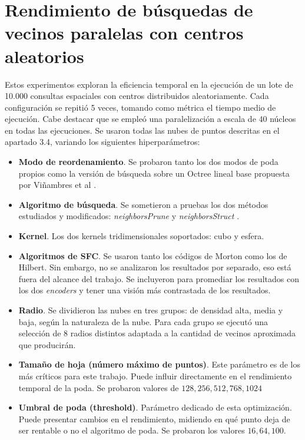 \section{Rendimiento de búsquedas de vecinos paralelas con centros aleatorios}
Estos experimentos exploran la eficiencia temporal en la ejecución de un lote de 10.000 consultas espaciales con centros distribuidos aleatoriamente. Cada configuración se repitió 5 veces, tomando como métrica el tiempo medio de ejecución. Cabe destacar que se empleó una paralelización a escala de 40 núcleos en todas las ejecuciones. Se usaron todas las nubes de puntos descritas en el apartado 3.4, variando los siguientes hiperparámetros:
\begin{itemize}
    \item \textbf{Modo de reordenamiento}. Se probaron tanto los dos modos de poda propios como la versión de búsqueda sobre un Octree lineal base propuesta por Viñambres et al \cite{Vinambres}.
    \item \textbf{Algoritmo de búsqueda}. Se sometieron a pruebas los dos métodos estudiados y modificados: \textit{neighborsPrune} y \textit{neighborsStruct} .
    \item  \textbf{Kernel}. Los dos kernels tridimensionales soportados: cubo y esfera.
    \item  \textbf{Algoritmos de SFC}. Se usaron tanto los códigos de Morton como los de Hilbert. Sin embargo, no se analizaron los resultados por separado, eso está fuera del alcance del trabajo. Se incluyeron para promediar los resultados con los dos \textit{encoders} y tener una visión más contrastada de los resultados.
    \item  \textbf{Radio}. Se dividieron las nubes en tres grupos: de densidad alta, media y baja, según la naturaleza de la nube. Para cada grupo se ejecutó una selección de 8 radios distintos adaptada a la cantidad de vecinos aproximada que producirán.
    \item \textbf{Tamaño de hoja (número máximo de puntos)}. Este parámetro es de los más críticos para este trabajo. Puede influir directamente en el rendimiento temporal de la poda. Se probaron valores de $128, 256, 512, 768, 1024$
    \item \textbf{Umbral de poda (threshold)}. Parámetro dedicado de esta optimización. Puede presentar cambios en el rendimiento, midiendo en qué punto deja de ser rentable o no el algoritmo de poda. Se probaron los valores $16, 64, 100$.
\end{itemize}

